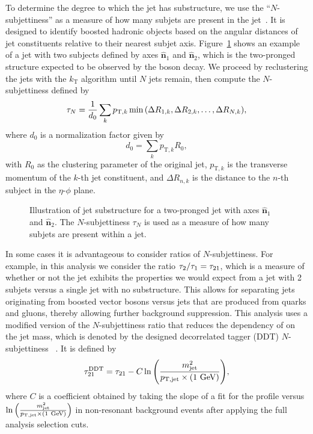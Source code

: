 To determine the degree to which the jet has substructure, we use the ``$N$-subjettiness'' as a measure of how many subjets are present in the jet~\cite{Thaler_2011,Thaler_2012}.
It is designed to identify boosted hadronic objects based on the angular distances of jet constituents relative to their nearest subjet axis.
Figure~\ref{fig:jetSubstruct} shows an example of a jet with two subjects defined by axes $\mathbf{\hat{n}}_1$ and $\mathbf{\hat{n}}_2$, which is the two-pronged structure expected to be observed by the \Vhad boson decay.
We proceed by reclustering the jets with the $k_\mathrm{T}$ algorithm until $N$ jets remain, then compute the $N$-subjettiness defined by
\begin{equation}
  \tau_N=\frac{1}{d_0}\sum_kp_{\mathrm{T},k}\min\pqty{\Delta R_{1,k},\Delta R_{2,k},\ldots,\Delta R_{N,k}},
\end{equation}
where $d_0$ is a normalization factor given by
\begin{equation}
  d_0=\sum_kp_{\mathrm{T},k}R_0,
\end{equation}
with $R_0$ as the clustering parameter of the original jet, $p_{\mathrm{T},k}$ is the transverse momentum of the $k$-th jet constituent, and $\Delta R_{n,k}$ is the distance to the $n$-th subject in the $\eta$-$\phi$ plane.

\begin{figure}[htbp]
  \centering
  
  \caption{
    Illustration of jet substructure for a two-pronged jet with axes $\mathbf{\hat{n}}_1$ and $\mathbf{\hat{n}}_2$.
    The $N$-subjettiness $\tau_N$ is used as a measure of how many subjets are present within a jet.
  }
  \label{fig:jetSubstruct}
\end{figure}

In some cases it is advantageous to consider ratios of $N$-subjettiness.
For example, in this analysis we consider the ratio $\tau_2/\tau_1=\tau_{21}$, which is a measure of whether or not the jet exhibits the properties we would expect from a jet with 2 subjets versus a single jet with no substructure.
This allows for separating jets originating from boosted vector bosons versus jets that are produced from quarks and gluons, thereby allowing further background suppression.
This analysis uses a modified version of the $N$-subjettiness ratio that reduces the dependency of \nsubj on the jet mass, which is denoted by the designed decorrelated tagger (DDT) $N$-subjettiness \nsubjDDT~\cite{Dolen_2016}.
It is defined by
\begin{equation}
  \nsubjDDT=\nsubj-C\ln\pqty{\frac{\MJ^2}{\ptjet\times(1\unit{GeV})}},
\end{equation}
where $C$ is a coefficient obtained by taking the slope of a fit for the \nsubj profile versus $\ln\pqty{\frac{\MJ^2}{\ptjet\times(1\unit{GeV})}}$ in non-resonant \Wjets background events after applying the full analysis selection cuts.

